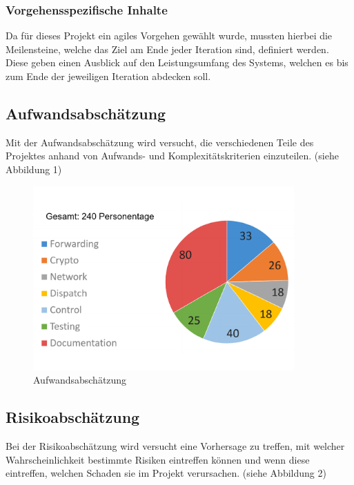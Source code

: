 \documentclass[a4paper, 11pt, ngerman, fleqn]{article}
\begin{document}
\subsubsection{Vorgehensspezifische Inhalte}
Da für dieses Projekt ein agiles Vorgehen gewählt wurde, mussten hierbei die Meilensteine, welche das Ziel am Ende jeder Iteration sind, definiert werden.
Diese geben einen Ausblick auf den Leistungsumfang des Systems, welchen es bis zum Ende der jeweiligen Iteration abdecken soll.

\subsection{Aufwandsabschätzung}
Mit der Aufwandsabschätzung wird versucht, die verschiedenen Teile des Projektes anhand von Aufwands- und Komplexitätskriterien einzuteilen. (siehe Abbildung 1)
\clearpage
	\begin{figure}
		\begin{center}
			\includegraphics[width= 10cm]{figures/Aufwandsabschaetzung.pdf}
			\caption{Aufwandsabschätzung}
		\end{center}
	\end{figure}

\subsection{Risikoabschätzung}
Bei der Risikoabschätzung wird versucht eine Vorhersage zu treffen, mit welcher Wahrscheinlichkeit bestimmte Risiken eintreffen können und wenn diese eintreffen, welchen Schaden sie im Projekt verursachen. (siehe Abbildung 2)
\end{document}
